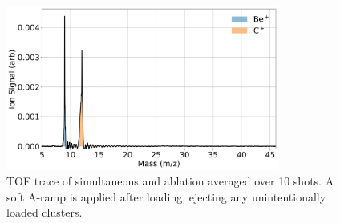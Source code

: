 \begin{figure}[H]
	\centering
	\includegraphics[width=0.8\textwidth]{images/Be_C_TOF.png}
	\caption{TOF trace of simultaneous  and  ablation averaged over 10 shots. A soft A-ramp is applied after loading, ejecting any unintentionally loaded  clusters.}
	\label{fig: Be C TOF}
\end{figure}